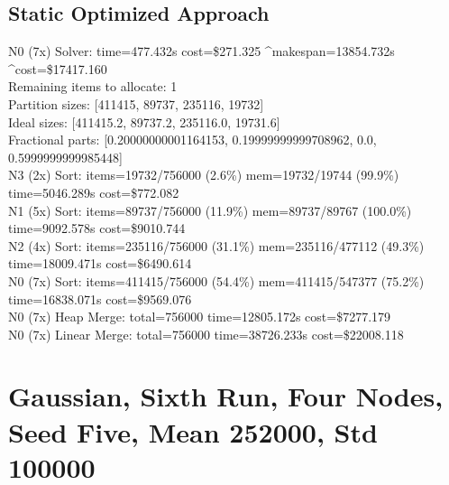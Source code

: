 \documentclass[]{interact}
\theoremstyle{plain}
\theoremstyle{definition}
\theoremstyle{remark}
\begin{document}
\subsection{Static Optimized Approach}
N0 (7x) Solver: time=477.432\textmu s cost=\$271.325 \^{}makespan=13854.732\textmu s \^{}cost=\$17417.160\\
Remaining items to allocate: 1\\
Partition sizes: [411415, 89737, 235116, 19732]\\
Ideal sizes: [411415.2, 89737.2, 235116.0, 19731.6]\\
Fractional parts: [0.20000000001164153, 0.19999999999708962, 0.0, 0.5999999999985448]\\
N3 (2x) Sort: items=19732/756000 (2.6\%) mem=19732/19744 (99.9\%) time=5046.289\textmu s cost=\$772.082\\
N1 (5x) Sort: items=89737/756000 (11.9\%) mem=89737/89767 (100.0\%) time=9092.578\textmu s cost=\$9010.744\\
N2 (4x) Sort: items=235116/756000 (31.1\%) mem=235116/477112 (49.3\%) time=18009.471\textmu s cost=\$6490.614\\
N0 (7x) Sort: items=411415/756000 (54.4\%) mem=411415/547377 (75.2\%) time=16838.071\textmu s cost=\$9569.076\\
N0 (7x) Heap Merge: total=756000 time=12805.172\textmu s cost=\$7277.179\\
N0 (7x) Linear Merge: total=756000 time=38726.233\textmu s cost=\$22008.118

\clearpage

\section{Gaussian, Sixth Run, Four Nodes, Seed Five, Mean 252000, Std 100000}
\end{document}
